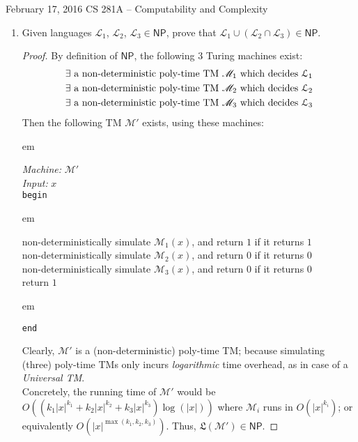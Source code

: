 \documentclass[usletter]{article}
\newcommand {\langset}[1]      {\ensuremath{\mathcal{#1}}}
\newcommand {\machine}[1]      {\ensuremath{\mathscr{#1}}}
\newcommand {\langfunc}        {\ensuremath{\mathfrak{L}}}
\newcommand {\family}[1]       {\ensuremath{\mathsf{#1}}}
\newcommand {\term}[1]      {\textit{#1}}
\newcommand {\indpar}[1]   {
  \par\leftskip=#1em
  \noindent\ignorespaces
}
\newenvironment{turing}[2] {
  \smallskip
  \indpar{2}
  \textit{Machine:} #1\\
  \textit{Input:} $#2$\\[5pt]
  \texttt{begin}
  \parskip=0pt
  \indpar{3}
}{
  \indpar{2}
  \texttt{end}
  \par\medskip
}
\newcommand {\langL}          {\langset{L}}
\newcommand {\machineM}       {\machine{M}}
\begin{document}
 {February 17, 2016}
            {CS 281A -- Computability and Complexity}

\begin{enumerate}[labelsep=2.5em, label=\textbf{\arabic{enumi}}]
  \item Given languages $\langL_1$, $\langL_2$, $\langL_3 \in \family{NP}$,
        prove that $\langL_1 \cup (\langL_2 \cap \langL_3) \in \family{NP}$.
  \begin{proof}
    By definition of \family{NP}, the following $3$ Turing machines exist:
    \begin{align}
      \label{q1_m1} \exists \textnormal{ a non-deterministic poly-time TM }
                      \machineM_1 \textnormal{ which decides } \langL_1 \\
      \label{q1_m2} \exists \textnormal{ a non-deterministic poly-time TM }
                      \machineM_2 \textnormal{ which decides } \langL_2 \\
      \label{q1_m3} \exists \textnormal{ a non-deterministic poly-time TM }
                      \machineM_3 \textnormal{ which decides } \langL_3
    \end{align}
    Then the following TM $\machineM'$ exists, using these machines:
    \begin{turing}{$\machineM'$}{x}
      non-deterministically simulate $\machineM_1(x)$,
        and return $1$ if it returns $1$ \\
      non-deterministically simulate $\machineM_2(x)$,
        and return $0$ if it returns $0$ \\
      non-deterministically simulate $\machineM_3(x)$,
        and return $0$ if it returns $0$ \\
      return $1$
    \end{turing}
    Clearly, $\machineM'$ is a (non-deterministic) poly-time TM;
    because simulating (three) poly-time TMs only incurs \textit{logarithmic}
    time overhead, as in case of a \term{Universal TM}. \\
    Concretely, the running time of $\machineM'$ would be
    $O((k_1 |x|^{k_1} + k_2 |x|^{k_2} + k_3 |x|^{k_3}) \log(|x|))$
    where $\machineM_i$ runs in $O(|x|^{k_i})$;
    or equivalently $O(|x|^{\max(k_1, k_2, k_3)})$.
    Thus, $\langfunc(\machineM') \in \family{NP}$.


\end{proof}
\end{enumerate}
\end{document}
